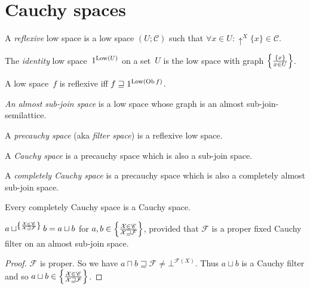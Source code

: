 \section{Cauchy spaces}

\begin{defn}
A \emph{reflexive} low space is a low space $( U ; \mathscr{C})$ such that
$\forall x \in U : \uparrow^X \{ x \} \in \mathscr{C}$.
\end{defn}

\begin{defn}
The \emph{identity} low space~$1^{\operatorname{Low}(U)}$ on a set~$U$ is the low space with graph $\left\{ \frac{\{x\}}{x\in U}\right\}$.
\end{defn}

\begin{obvious}\label{cs-refl-by-id}
A low space~$f$ is reflexive iff $f\sqsupseteq 1^{\operatorname{Low}(\operatorname{Ob} f)}$.
\end{obvious}

\begin{defn}
\emph{An almost sub-join space} is a low space whose graph is an almost sub-join-semilattice.
\end{defn}

\begin{defn}
A \emph{precauchy space} (aka \emph{filter space}) is a reflexive low space.
\end{defn}


\begin{defn}
  A \emph{Cauchy space} is a precauchy space which is also a sub-join space.
\end{defn}

\begin{defn}
  A \emph{completely Cauchy space} is a precauchy space which is also a completely almost sub-join space.
\end{defn}

\begin{obvious}
Every completely Cauchy space is a Cauchy space.
\end{obvious}

\begin{prop}
  $a\sqcup^{
    \left\{ \frac{\mathcal{X} \in \mathscr{C} }{\mathcal{X} \sqsupseteq \mathcal{F}}\right\}
  } b = a\sqcup b$ for
  $a,b \in \left\{ \frac{\mathcal{X} \in \mathscr{C} }{\mathcal{X} \sqsupseteq \mathcal{F}}\right\}$,
  provided that $\mathcal{F}$ is a proper fixed Cauchy filter on an almost sub-join space.
\end{prop}

\begin{proof}
  $\mathcal{F}$ is proper. So
  we have $a \sqcap b \sqsupseteq \mathcal{F} \neq \bot^{\mathscr{F} (X)}$. Thus $a\sqcup b$ is a Cauchy
  filter and so $a\sqcup b \in \left\{ \frac{\mathcal{X} \in \mathscr{C} }{\mathcal{X} \sqsupseteq \mathcal{F}}\right\}$.
\end{proof}

